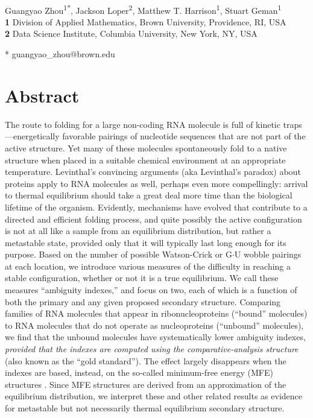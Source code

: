 \documentclass[10pt,letterpaper]{article}
\date{}
\begin{document}
\vspace*{0.2in}


\begin{flushleft}
{\Large
\textbf{} 
}
\newline
\\
Guangyao Zhou\textsuperscript{1*},
Jackson Loper\textsuperscript{2},
Matthew T. Harrison\textsuperscript{1},
Stuart Geman\textsuperscript{1}
\\
\bigskip
\textbf{1} Division of Applied Mathematics, Brown University, Providence, RI, USA
\\
\textbf{2} Data Science Institute, Columbia University, New York, NY, USA
\\
\bigskip

* guangyao\_zhou@brown.edu

\end{flushleft}

\section*{Abstract}
The route to folding for a large non-coding RNA molecule is full of 
kinetic traps---energetically favorable pairings of nucleotide sequences that are not part of the active structure. Yet many of these molecules spontaneously fold to a native structure when placed in a suitable chemical environment at an appropriate temperature.
Levinthal's convincing arguments\cite{Levinthal1969-hi} (aka Levinthal's paradox) about proteins apply to RNA molecules as well, perhaps even more compellingly: arrival to thermal equilibrium should take a great deal more time than the biological lifetime of the organism. Evidently, mechanisms have evolved that contribute to a directed and efficient folding process, and quite possibly the active configuration is not at all like a sample from an equilibrium distribution, but rather a metastable state, provided only that it will typically last long enough for its purpose. 
Based on the number of possible Watson-Crick or G$\cdot$U wobble pairings at each location, we
introduce various measures of the difficulty in reaching a stable configuration, whether or not it is a true equilibrium.
We call these measures ``ambiguity indexes,'' and focus on two, each of which is a function of both the primary and any given proposed secondary structure. Comparing families of RNA molecules that appear in ribonucleoproteins (``bound'' molecules) to RNA molecules that do not operate as nucleoproteins (``unbound'' molecules), we find that the unbound molecules have systematically lower ambiguity indexes, {\em provided that the indexes are computed using the comparative-analysis \cite{Gutell1992-hu} structure} (also known as the ``gold standard''). The effect largely disappears when the indexes are based, instead, on the so-called minimum-free energy (MFE) structures \cite{Mathews1999-hc,Zuker1999-rc}. Since MFE structures are derived from an approximation of the equilibrium distribution, we interpret these and other related results as evidence for metastable but not necessarily thermal equilibrium secondary structure. 
\end{document}
